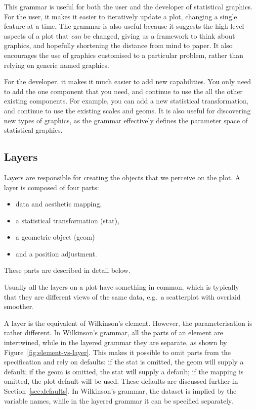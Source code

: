 This grammar is useful for both the user and the developer of statistical graphics.  For the user, it makes it easier to iteratively update a plot, changing a single feature at a time.  The grammar is also useful because it suggests the high level aspects of a plot that \emph{can} be changed, giving us a framework to think about graphics, and hopefully shortening the distance from mind to paper.  It also encourages the use of graphics customised to a particular problem, rather than relying on generic named graphics.

For the developer, it makes it much easier to add new capabilities. You only need to add the one component that you need, and continue to use the all the other existing components.  For example, you can add a new statistical transformation, and continue to use the existing scales and geoms.  It is also useful for discovering new types of graphics, as the grammar effectively defines the parameter space of statistical graphics.

\subsection{Layers}

Layers are responsible for creating the objects that we perceive on the plot.  A layer is composed of four parts:  

\begin{itemize}
	\item data and aesthetic mapping,
	\item a statistical transformation (stat), 
	\item a geometric object (geom)
	\item and a position adjustment.
\end{itemize}

\noindent These parts are described in detail below.

Usually all the layers on a plot have something in common, which is typically that they are different views of the same data, e.g.\ a scatterplot with overlaid smoother.  

A layer is the equivalent of Wilkinson's {\sc element}.  However, the parameterisation is rather different.  In Wilkinson's grammar, all the parts of an element are intertwined, while in the layered grammar they are separate, as shown by Figure~\ref{fig:element-vs-layer}. This makes it possible to omit parts from the specification and rely on defaults: if the stat is omitted, the geom will supply a default; if the geom is omitted, the stat will supply a default; if the mapping is omitted, the plot default will be used.  These defaults are discussed further in Section~\ref{sec:defaults}.  In Wilkinson's grammar, the dataset is implied by the variable names, while in the layered grammar it can be specified separately.

